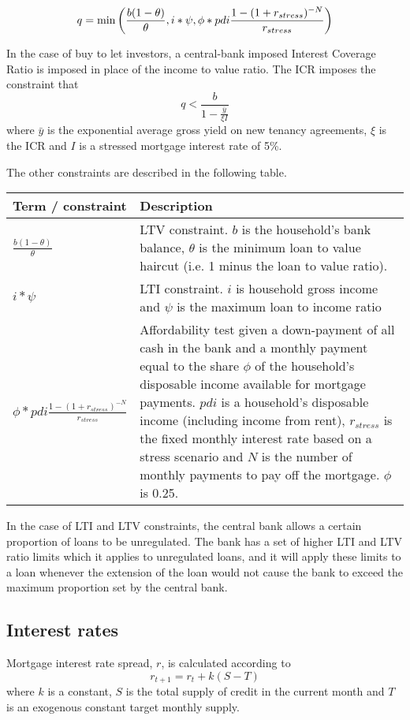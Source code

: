 \documentclass{report}
\begin{document}
\bigskip 
\begin{equation}
q=\min \left( \frac{b(1-\theta )}{\theta },i\ast \psi ,\phi \ast pdi\frac{%
1-(1+r_{stress})^{-N}}{r_{stress}}\right)
\end{equation}

In the case of buy to let investors, a central-bank imposed Interest Coverage Ratio is imposed in place of the income to value ratio. The ICR imposes the constraint that
\begin{equation}
q < \frac{b}{1 - \frac{\bar{y}}{\xi I}}
\end{equation}
where $\bar{y}$ is the exponential average gross yield on new tenancy agreements, $\xi$ is the ICR and $I$ is a stressed mortgage interest rate of 5\%.

The other constraints are described in the following table.


\noindent \bigskip 
\begin{tabular}{p{1.5in}|p{4in}}
Term / constraint & Description \\ \hline\hline
$\frac{b(1-\theta )}{\theta }$ & LTV constraint. $b$ is the household's bank
balance, $\theta $ is the minimum loan to value haircut (i.e. 1 minus the
loan to value ratio). \\ 
$i\ast \psi $ & LTI constraint. $i$ is household gross income and $\psi $ is
the maximum loan to income ratio \\ 
$\phi \ast pdi\frac{1-(1+r_{stress})^{-N}}{r_{stress}}$ & Affordability test
given a down-payment of all cash in the bank and a monthly payment equal to
the share $\phi $ of the household's disposable income available for
mortgage payments. $pdi$ is a household's disposable income (including
income from rent), $r_{stress}$ is the fixed monthly interest rate based on
a stress scenario and $N$ is the number of monthly payments to pay off the
mortgage. $\phi $ is 0.25.%
\end{tabular}

In the case of LTI and LTV constraints, the central bank allows a certain proportion of loans to be unregulated. The bank has a set of higher LTI and LTV ratio limits which it applies to unregulated loans, and it will apply these limits to a loan whenever the extension of the loan would not cause the bank to exceed the maximum proportion set by the central bank.

\subsection{Interest rates}
Mortgage interest rate spread, $r$, is calculated according to
\begin{equation}
r_{t+1} = r_{t} + k(S-T)
\label{spread}
\end{equation}
where $k$ is a constant, $S$ is the total supply of credit in the current month and $T$ is an exogenous constant target monthly supply.
\end{document}
